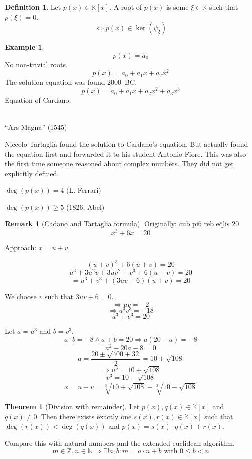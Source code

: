 \documentclass[a4paper,landscape,twocolumn]{article}
\theoremstyle{definition}
\newtheorem{theorem}{Theorem}
\newtheorem{defi}{Definition}
\newtheorem{ex}{Example}
\newtheorem{rem}{Remark}
\DeclareMathOperator\kernel{ker} %
\begin{document}
\begin{defi}
  \label{defi-9.15}
  Let $p(x) \in \mathbb K[x]$.
  A root of $p(x)$ is some $\xi \in \mathbb K$ such that $p(\xi) = 0$.
  \[ \Leftrightarrow p(x) \in \kernel(\psi_\xi) \]
\end{defi}

\begin{ex}
  \[ p(x) = a_0 \]
  No non-trivial roots.
  \[ p(x) = a_0 + a_1 x + a_2 x^2 \]
  The solution equation was found 2000~BC.
  \[ p(x) = a_0 + a_1 x + a_2 x^2 + a_3 x^3 \]
  Equation of Cardano.

   \\
  \enquote{Ars Magna} (1545)


  Niccolo Tartaglia found the solution to Cardano's equation.
  But actually  found the equation first
  and forwarded it to his student Antonio Fiore.
  This was also the first time someone reasoned about complex numbers.
  They did not get explicitly defined.

  $\deg(p(x)) = 4$ (L. Ferrari)

  $\deg(p(x)) \geq 5$ (1826, Abel)
\end{ex}

\begin{rem}[Cadano and Tartaglia formula]
  \label{bem-9.16}
  Originally: cub pi6 reb e$\overline{\textrm{q}}$lis 20
  \[ x^3 + 6x = 20 \]

  Approach: $x = u + v$.

  \[ (u + v)^3 + 6 (u + v) = 20 \]
  \[ u^3 + 3u^2 v + 3uv^2 + v^3 + 6 (u + v) = 20 \]
  \[ = u^3 + v^3 + (3uv + 6) (u + v) = 20 \]

  We choose $v$ such that $3uv + 6 = 0$.
  \[ \Rightarrow uv = -2 \]
  \[ \Rightarrow u^3 v^3 = -18 \]
  \[ u^3 + v^3 = 20 \]

  Let $a = u^3$ and $b = v^3$.
  \[ a \cdot b = -8 \land a + b = 20 \Rightarrow a(20 - a) = -8 \]
  \[ a^2 - 20a - 8 = 0 \]
  \[ a = \frac{20 \pm \sqrt{400 + 32}}{2} = 10 \pm \sqrt{108} \]
  \[ \Rightarrow u^3 = 10 + \sqrt{108} \]
  \[ v^3 = 10 - \sqrt{108} \]
  \[ x = u + v = \sqrt[3]{10 + \sqrt{108}} + \sqrt[3]{10 - \sqrt{108}} \]
\end{rem}

\begin{theorem}[Division with remainder]
  \label{satz-9.17}
  Let $p(x), q(x) \in \mathbb K[x]$ and $q(x) \neq 0$.
  Then there exists exactly one $s(x), r(x) \in \mathbb K[x]$ such that $\deg(r(x)) < \deg(q(x))$
  and $p(x) = s(x) \cdot q(x) + r(x)$.

  Compare this with natural numbers and the extended euclidean algorithm.
  \[ m \in \mathbb Z, n \in \mathbb N \Rightarrow \exists! a,b: m = a\cdot n + b \text{ with } 0 \leq b < n \]
\end{theorem}
\end{document}
